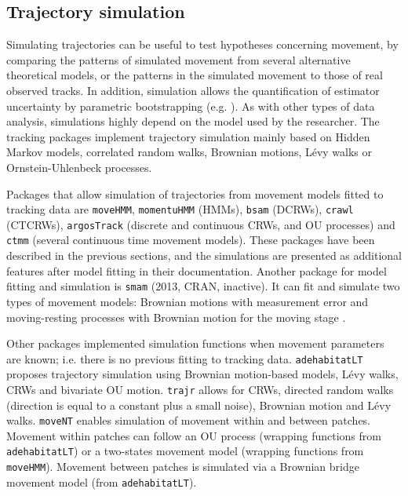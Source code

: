 \documentclass[a4paper,12pt]{article}
\newcommand{\Rpkg}[1]{\texttt{#1}}
\begin{document}
\subsection*{Trajectory simulation} 

Simulating trajectories can be useful to test hypotheses concerning movement, by comparing the patterns of simulated movement from several alternative theoretical models, or the patterns in the simulated movement to those of real observed tracks. In addition, simulation allows the quantification of estimator uncertainty by parametric bootstrapping (e.g. \cite{Michelot2016}). As with other types of data analysis, simulations highly depend on the model used by the researcher. 
The tracking packages implement trajectory simulation mainly based on Hidden Markov models, correlated random walks, Brownian motions, L\'evy walks or Ornstein-Uhlenbeck processes. %

Packages that allow simulation of trajectories from movement models fitted to tracking data are \Rpkg{moveHMM}, \Rpkg{momentuHMM} (HMMs), \Rpkg{bsam} (DCRWs), \Rpkg{crawl} (CTCRWs), \Rpkg{argosTrack} (discrete and continuous CRWs, and OU processes) and \Rpkg{ctmm} (several continuous time movement models). These packages have been described in the previous sections, and the simulations are presented as additional features after model fitting in their documentation. Another package for model fitting and simulation is \Rpkg{smam} (2013, CRAN, inactive). It can fit and simulate two types of movement models: Brownian motions with measurement error \citep{Pozdnyakov2014} and moving-resting processes with Brownian motion for the moving stage \citep{Yan2014}.

Other packages implemented simulation functions when movement parameters are known; i.e. there is no previous fitting to tracking data. \Rpkg{adehabitatLT} proposes trajectory simulation using Brownian motion-based models, L\'evy walks, CRWs and bivariate OU motion. \Rpkg{trajr} allows for CRWs, directed random walks (direction is equal to a constant plus a small noise), Brownian motion and L\'evy walks. \Rpkg{moveNT} enables simulation of movement within and between patches. Movement within patches can follow an OU process (wrapping functions from \Rpkg{adehabitatLT}) or a two-states movement model (wrapping functions from \Rpkg{moveHMM}). Movement between patches is simulated via a Brownian bridge movement model (from \Rpkg{adehabitatLT}). 
\end{document}

